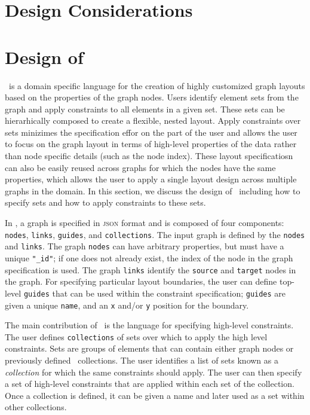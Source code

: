 \section{Design Considerations}


\section{Design of \projectname}
\projectname~is a domain specific language for the creation of highly customized graph layouts based on the properties of the graph nodes. Users identify element sets from the graph and apply constraints to all elements in a given set. These sets can be hierarhically composed to create a flexible, nested layout. Apply constraints over sets minizimes the specification effor on the part of the user and allows the user to focus on the graph layout in terms of high-level properties of the data rather than node specific details (such as the node index). These layout specificatiosn can also be easily reused across graphs for which the nodes have the same properties, which allows the user to apply a single layout design across multiple graphs in the domain. In this section, we discuss the design of \projectname~including how to specify sets and how to apply constraints to these sets.

In \projectname, a graph is specified in \textsc{json} format and is composed of four components: \texttt{nodes}, \texttt{links}, \texttt{guides}, and \texttt{collections}. The input graph is defined by the \texttt{nodes} and \texttt{links}. The graph \texttt{nodes} can have arbitrary properties, but must have a unique \texttt{"\_id"}; if one does not already exist, the index of the node in the graph specification is used. The graph \texttt{links} identify the \texttt{source} and \texttt{target} nodes in the graph. For specifying particular layout boundaries, the user can define top-level \texttt{guides} that can be used within the constraint specification; \texttt{guides} are given a unique \texttt{name}, and an \texttt{x} and/or \texttt{y} position for the boundary.

The main contribution of \projectname~is the language for specifying high-level constraints. The user defines \texttt{collections} of sets over which to apply the high level constraints. Sets are groups of elements that can contain either graph nodes or previously defined \projectname~collections. The user identifies a list of sets known as a \emph{collection} for which the same constraints should apply. The user can then specify a set of high-level constraints that are applied within each set of the collection. Once a collection is defined, it can be given a name and later used as a set within other collections.

